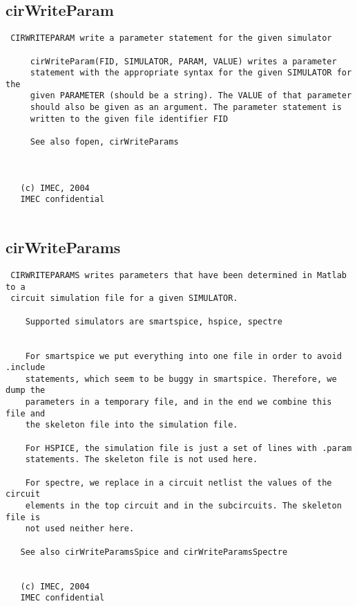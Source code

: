 \newpage
\subsection{cirWriteParam}
\label{sec:cirWriteParam}
\begin{verbatim}
 CIRWRITEPARAM write a parameter statement for the given simulator
 
     cirWriteParam(FID, SIMULATOR, PARAM, VALUE) writes a parameter
     statement with the appropriate syntax for the given SIMULATOR for the
     given PARAMETER (should be a string). The VALUE of that parameter
     should also be given as an argument. The parameter statement is
     written to the given file identifier FID
 
     See also fopen, cirWriteParams
 
 
 
   (c) IMEC, 2004
   IMEC confidential 
 

\end{verbatim}

\newpage
\subsection{cirWriteParams}
\label{sec:cirWriteParams}
\begin{verbatim}
 CIRWRITEPARAMS writes parameters that have been determined in Matlab to a
 circuit simulation file for a given SIMULATOR.
  
    Supported simulators are smartspice, hspice, spectre
 
 
    For smartspice we put everything into one file in order to avoid .include
    statements, which seem to be buggy in smartspice. Therefore, we dump the
    parameters in a temporary file, and in the end we combine this file and
    the skeleton file into the simulation file.
 
    For HSPICE, the simulation file is just a set of lines with .param
    statements. The skeleton file is not used here.
 
    For spectre, we replace in a circuit netlist the values of the circuit
    elements in the top circuit and in the subcircuits. The skeleton file is
    not used neither here.
 
   See also cirWriteParamsSpice and cirWriteParamsSpectre
 
 
   (c) IMEC, 2004
   IMEC confidential 
 

\end{verbatim}

